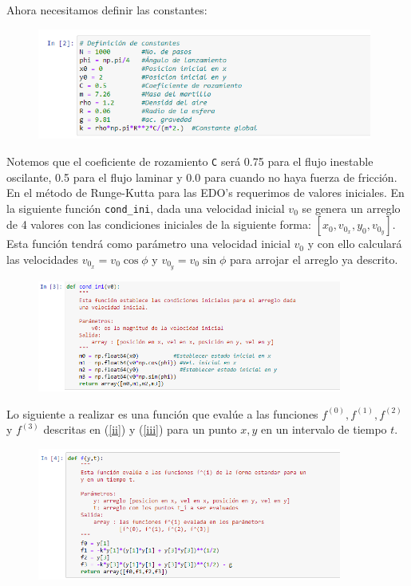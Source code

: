 \documentclass[11pt]{article}
\begin{document}
	Ahora necesitamos definir las constantes:
	\begin{figure}[h]
		\centering
		\includegraphics[width=11cm]{Img/2.PNG}
	\end{figure}

	Notemos que el coeficiente de rozamiento \texttt{C} será 0.75 para el flujo inestable oscilante, 0.5 para el flujo laminar y 0.0 para cuando no haya fuerza de fricción.\\
	En el método de Runge-Kutta para las EDO's requerimos de valores iniciales. En la siguiente función \texttt{cond\_ini}, dada una velocidad inicial $v_0$ se genera un arreglo de 4 valores con las condiciones iniciales de la siguiente forma: $[x_0, v_{0_x}, y_0, v_{0_y}]$. Esta función tendrá como parámetro una velocidad inicial $v_0$ y con ello calculará las velocidades $v_{0_x}=v_0\cos\phi$ y $v_{0_y}=v_0\sin\phi$ para arrojar el arreglo ya descrito.

\newpage
	\begin{figure}[h]
		\centering
		\includegraphics[width=10cm]{Img/3.PNG}
	\end{figure}

	Lo siguiente a realizar es una función que evalúe a las funciones $f^{(0)}, f^{(1)}, f^{(2)}$ y $f^{(3)}$ descritas en (\ref{ii}) y (\ref{iii})	para un punto $x,y$ en un intervalo de tiempo $t$.
	\begin{figure}[h]
		\centering
		\includegraphics[width=10cm]{Img/4.PNG}
	\end{figure}
\end{document}
